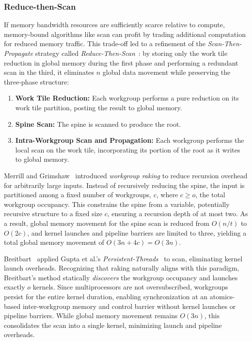 \documentclass[sigconf]{acmart}
\begin{document}
\subsubsection{Reduce-then-Scan}
If memory bandwidth resources are sufficiently scarce relative to compute, memory-bound algorithms like scan can profit by trading additional computation for reduced memory traffic. This trade-off led to a refinement of the \emph{Scan-Then-Propagate} strategy called \emph{Reduce-Then-Scan}~\cite{10.1145/1375527.1375559, Merrill2009, 10.1109/TPDS.2012.336, 10.5555/2031978.2032029}: by storing only the work tile reduction in global memory during the first phase and performing a redundant scan in the third, it eliminates $n$ global data movement while preserving the three-phase structure:
\begin{enumerate}
  \item \textbf{Work Tile Reduction:} Each workgroup performs a pure reduction on its work tile partition, posting the result to global memory.
  \item \textbf{Spine Scan:} The spine is scanned to produce the root.
  \item \textbf{Intra-Workgroup Scan and Propagation:} Each workgroup performs the local scan on the work tile, incorporating its portion of the root as it writes to global memory.
\end{enumerate}

Merrill and Grimshaw~\cite{Merrill2009} introduced \emph{workgroup raking} to reduce recursion overhead for arbitrarily large inputs. Instead of recursively reducing the spine, the input is partitioned among a fixed number of workgroups, $c$, where $c \geq o$, the total workgroup occupancy. This constrains the spine from a variable, potentially recursive structure to a fixed size $c$, ensuring a recursion depth of at most two. As a result, global memory movement for the spine scan is reduced from $O(n/t)$ to $O(2c)$, and kernel launches and pipeline barriers are limited to three, yielding a total global memory movement of $O(3n + 4c) = O(3n)$.

Breitbart~\cite{10.5555/2031978.2032029} applied Gupta et al.'s \emph{Persistent-Threads}~\cite{gupta2012} to scan, eliminating kernel launch overheads. Recognizing that raking naturally aligns with this paradigm, Breitbart's method statically \emph{discovers} the workgroup occupancy and launches exactly $o$ kernels. Since multiprocessors are not oversubscribed, workgroups persist for the entire kernel duration, enabling synchronization at an atomics-based inter-workgroup memory and control barrier without kernel launches or pipeline barriers. While global memory movement remains $O(3n)$, this consolidates the scan into a single kernel, minimizing launch and pipeline overheads.
\end{document}
